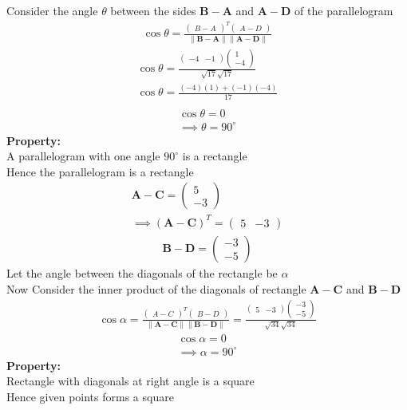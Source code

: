 \documentclass{beamer}
\theoremstyle{remark}
\newcommand{\myvec}[1]{\ensuremath{\begin{pmatrix}#1\end{pmatrix}}}
\let\vec\mathbf
\numberwithin{equation}{section}
\begin{document}
      Consider the angle $\theta$ between the sides $\vec{B-A}$ and $\vec{A-D}$ of the parallelogram\\
      \begin{align}
      \cos{\theta}=\frac{\myvec{B-A}^T\myvec{A-D}}{\|\vec{B-A}\|\|\vec{A-D}\|}
      \end{align}
      \begin{align}
          \cos{\theta}=\frac{\myvec{-4 & -1}\myvec{1\\-4}}{\sqrt{17}\sqrt{17}}\\
          \cos{\theta}=\frac{(-4)(1)+(-1)(-4)}{17}\\
      \end{align}
      \begin{align}
          \cos{\theta}=0\\
     \implies  \theta=90^\circ
      \end{align}
      \textbf{Property:}\\
      A parallelogram with one angle $90^\circ$ is a rectangle\\
      Hence the parallelogram is a rectangle\\
      \begin{align}
      \vec{A-C}=\myvec{5\\-3}\\
      \implies \vec{(A-C)}^T=\myvec{5 & -3}
      \end{align}
      \begin{align}
          \vec{B-D}=\myvec{-3\\-5}
      \end{align}
      Let the angle between the diagonals of the rectangle be $\alpha$\\
      Now Consider the inner product of the diagonals of rectangle $\vec{A-C}$ and $\vec{B-D}$ \\
      \begin{align}
      \cos{\alpha}=\frac{\myvec{A-C}^T\myvec{B-D}}{\|\vec{A-C}\|\|\vec{B-D}\|}=\frac{\myvec{5&-3}\myvec{-3\\-5}}{\sqrt{34}\sqrt{34}}
      \end{align}
      \begin{align}
          \cos{\alpha}=0\\
       \implies \alpha=90^\circ
      \end{align}
      \textbf{Property:}\\
      Rectangle with diagonals at right angle is a square\\
      Hence given points forms a square\\
\end{document}
